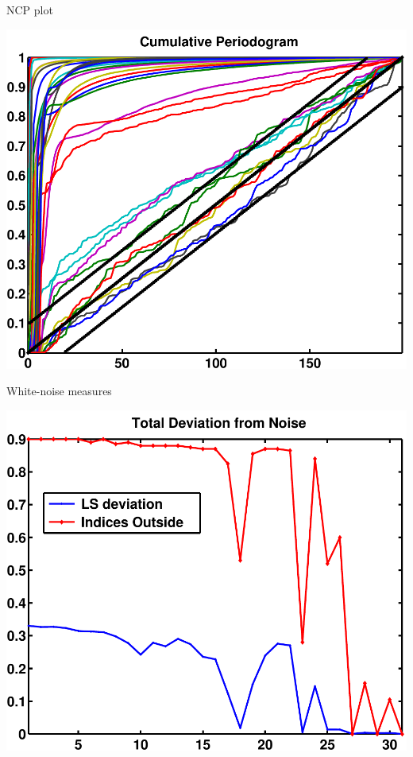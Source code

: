 \documentclass{beamer}
\begin{document}
\begin{frame}{NCP plot}
  \begin{center}
    \includegraphics[width=0.55\linewidth]{figures/run1/cum_per}
  \end{center}
\end{frame}

\begin{frame}{White-noise measures}
  \begin{center}
    \includegraphics[width=0.55\linewidth]{figures/run1/total_deviation}
  \end{center}
\end{frame}
\end{document}

